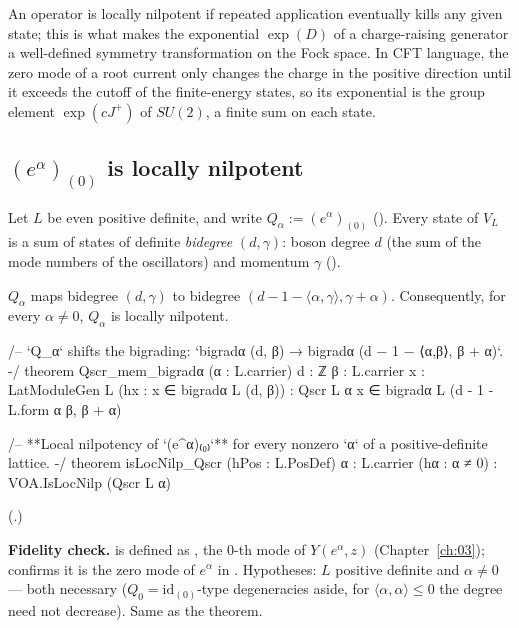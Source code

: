 \begin{physics}
An operator is locally nilpotent if repeated application eventually kills any given state; this is what makes the exponential $\exp(D)$ of a charge-raising generator a well-defined symmetry transformation on the Fock space. In CFT language, the zero mode of a root current only changes the charge in the positive direction until it exceeds the cutoff of the finite-energy states, so its exponential is the group element $\exp(cJ^+)$ of $SU(2)$, a finite sum on each state.
\end{physics}

\subsection{\texorpdfstring{$(e^\alpha)_{(0)}$}{(e\^{}alpha)(0)} is locally nilpotent}

Let $L$ be even positive definite, and write $Q_\alpha:=(e^\alpha)_{(0)}$ ().  Every
state of $V_L$ is a sum of states of definite \emph{bidegree} $(d,\gamma)$: boson degree $d$ (the sum
of the mode numbers of the oscillators) and momentum $\gamma$ ().

\begin{theorem}\label{ch11:thm:locnilp}
$Q_\alpha$ maps bidegree $(d,\gamma)$ to bidegree $(d-1-\langle\alpha,\gamma\rangle,\gamma+\alpha)$.
Consequently, for every $\alpha\neq0$, $Q_\alpha$ is locally nilpotent.
\end{theorem}
\begin{leancode}
/-- `Q_α` shifts the bigrading: `bigradα (d, β) → bigradα (d − 1 − ⟨α,β⟩, β + α)`. -/
theorem Qscr_mem_bigradα (α : L.carrier) {d : ℤ} {β : L.carrier} {x : LatModuleGen L}
    (hx : x ∈ bigradα L (d, β)) :
    Qscr L α x ∈ bigradα L (d - 1 - L.form α β, β + α)

/-- **Local nilpotency of `(e^α)₍₀₎`** for every nonzero `α` of a positive-definite lattice. -/
theorem isLocNilp_Qscr (hPos : L.PosDef) {α : L.carrier} (hα : α ≠ 0) :
    VOA.IsLocNilp (Qscr L α)
\end{leancode}
(.)
\begin{dictionary}
\textbf{Fidelity check.}   is defined as , the $0$-th mode of
$Y(e^\alpha,z)$ (Chapter~\ref{ch:03});  confirms it is the zero mode of
$e^\alpha$ in .  Hypotheses: $L$ positive definite and $\alpha\neq0$ --- both
necessary ($Q_0=\mathrm{id}_{(0)}$-type degeneracies aside, for $\langle\alpha,\alpha\rangle\le0$ the
degree need not decrease).  Same as the theorem.
\end{dictionary}

